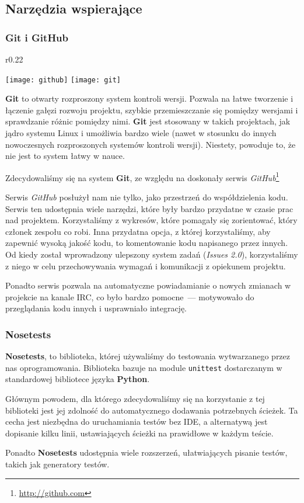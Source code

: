 ﻿\subsection{Narzędzia wspierające}

\subsubsection{Git i GitHub}
\begin{wrapfigure}{r}{0.22\textwidth}
  \begin{center}
    \texttt{[image: github]}
    \texttt{[image: git]}
  \end{center}
\end{wrapfigure}
\textbf{Git} to otwarty rozproszony system kontroli wersji.
Pozwala na łatwe tworzenie i łączenie gałęzi rozwoju projektu, szybkie przemieszczanie się pomiędzy wersjami i sprawdzanie różnic pomiędzy nimi.
\textbf{Git} jest stosowany w takich projektach, jak jądro systemu Linux i umożliwia bardzo wiele (nawet w stosunku do innych nowoczesnych rozproszonych systemów kontroli wersji).
Niestety, powoduje to, że nie jest to system łatwy w nauce.

Zdecydowaliśmy się na system \textbf{Git}, ze względu na doskonały serwis \emph{GitHub}\footnote{\url{http://github.com}}

Serwis \emph{GitHub} posłużył nam nie tylko, jako przestrzeń do współdzielenia kodu.
Serwis ten udostępnia wiele narzędzi, które były bardzo przydatne w czasie prac nad projektem.
Korzystaliśmy z wykresów, które pomagały się zorientować, który członek zespołu co robi.
Inna przydatna opcja, z której korzystaliśmy, aby zapewnić wysoką jakość kodu, to komentowanie kodu napisanego przez innych.
Od kiedy został wprowadzony ulepszony system zadań (\emph{Issues 2.0}), korzystaliśmy z niego w celu przechowywania wymagań i komunikacji z opiekunem projektu.

Ponadto serwis pozwala na automatyczne powiadamianie o nowych zmianach w projekcie na kanale IRC, co było bardzo pomocne~--- motywowało do przeglądania kodu innych i usprawniało integrację.


\subsubsection{Nosetests}
\textbf{Nosetests}, to biblioteka, której używaliśmy do testowania wytwarzanego przez nas oprogramowania.
Biblioteka bazuje na module \texttt{unittest} dostarczanym w standardowej bibliotece języka \textbf{Python}.

Głównym powodem, dla którego zdecydowaliśmy się na korzystanie z tej biblioteki jest jej zdolność do automatycznego dodawania potrzebnych ścieżek.
Ta cecha jest niezbędna do uruchamiania testów bez IDE, a alternatywą jest dopisanie kilku linii, ustawiających ścieżki na prawidłowe w każdym teście.

Ponadto \textbf{Nosetests} udostępnia wiele rozszerzeń, ułatwiających pisanie testów, takich jak generatory testów.
